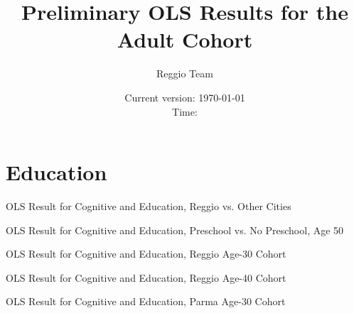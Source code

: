 



\title{Preliminary OLS Results for the Adult Cohort}
\author{Reggio Team}
\date{Current version: \today \\ \vspace{1em} Time: \currenttime}
\maketitle


\doublespacing
\listoftables


\section{Education}
\begin{table}[H]
\begin{center}
	\caption{OLS Result for Cognitive and Education, Reggio vs. Other Cities} \label{tab:rvsother_E}
		
\end{center}
\end{table}

\begin{table}[H]
\begin{center}
	\caption{OLS Result for Cognitive and Education, Preschool vs. No Preschool, Age 50} \label{tab:yesvsno50_E}
		
\end{center}
\end{table}


\begin{table}[H]
\begin{center}
	\caption{OLS Result for Cognitive and Education, Reggio Age-30 Cohort} \label{tab:reggio30_E}
		
\end{center}
\end{table}

\begin{table}[H]
\begin{center}
	\caption{OLS Result for Cognitive and Education, Reggio Age-40 Cohort} \label{tab:reggio40_E}
		
\end{center}
\end{table}


\begin{table}[H]
\begin{center}
	\caption{OLS Result for Cognitive and Education, Parma Age-30 Cohort} \label{tab:parma30_E}
		
\end{center}
\end{table}

